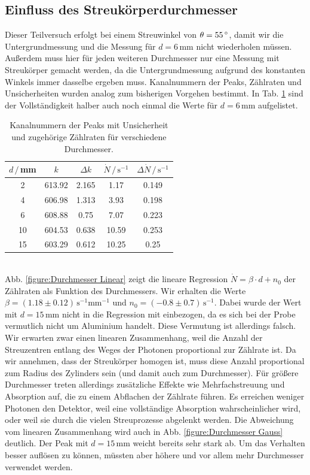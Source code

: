 \documentclass[german, parskip=full]{scrartcl}
\newcommand{\tecxt}{}
\begin{document}
\subsection{Einfluss des Streukörperdurchmesser}
Dieser Teilversuch erfolgt bei einem Streuwinkel von $\theta=55\,\degree$, damit wir die Untergrundmessung und die Messung für $d=6\,$mm nicht wiederholen müssen. Außerdem muss hier für jeden weiteren Durchmesser nur eine Messung mit Streukörper gemacht werden, da die Untergrundmessung aufgrund des konstanten Winkels immer dasselbe ergeben muss. Kanalnummern der Peaks, Zählraten und Unsicherheiten wurden analog zum bisherigen Vorgehen bestimmt. In Tab. \ref{table:Durchmesser} sind der Vollständigkeit halber auch noch einmal die Werte für $d=6\,$mm aufgelistet. 
\begin{table}[h!]
\centering
\begin{tabular}{c|c|c|c|c}
$d\,/\,$mm&$k$&$\Delta k$&$\dot{N}\,/\,\tecxt\text{s}^{-1}$&$\Delta\dot{N}\,/\,\tecxt\text{s}^{-1}$\\ \hline
2 & 613.92 & 2.165 & 1.17 & 0.149 \\ \hline
4 & 606.98 & 1.313 & 3.93 & 0.198 \\ \hline
6 & 608.88 & 0.75 & 7.07 & 0.223 \\ \hline
10 & 604.53 & 0.638 & 10.59 & 0.253 \\ \hline
15 & 603.29 & 0.612 & 10.25 & 0.25 \\ 
\end{tabular}
\caption{Kanalnummern der Peaks mit Unsicherheit und zugehörige Zählraten für verschiedene Durchmesser.}
\label{table:Durchmesser}
\end{table}\\
Abb. \ref{figure:Durchmesser Linear} zeigt die lineare Regression $\dot{N}=\beta\cdot d + n_0$ der Zählraten als Funktion des Durchmessers. Wir erhalten die Werte $\beta=(1.18 \pm 0.12)\,\tecxt\text{s}^{-1}\tecxt\text{mm}^{-1}$ und $n_0=(-0.8\pm 0.7)\,\tecxt\text{s}^{-1}$. Dabei wurde der Wert mit $d=15\,$mm nicht in die Regression mit einbezogen, da es sich bei der Probe vermutlich nicht um Aluminium handelt. Diese Vermutung ist allerdings falsch. Wir erwarten zwar einen linearen Zusammenhang, weil die Anzahl der Streuzentren entlang des Weges der Photonen proportional zur Zählrate ist. Da wir annehmen, dass der Streukörper homogen ist, muss diese Anzahl proportional zum Radius des Zylinders sein (und damit auch zum Durchmesser). Für größere Durchmesser treten allerdings zusätzliche Effekte wie Mehrfachstreuung und Absorption auf, die zu einem Abflachen der Zählrate führen. Es erreichen weniger Photonen den Detektor, weil eine vollständige Absorption wahrscheinlicher wird, oder weil sie durch die vielen Streuprozesse abgelenkt werden. Die Abweichung vom linearen Zusammenhang wird auch in Abb. \ref{figure:Durchmesser Gauss} deutlich. Der Peak mit $d=15\,$mm weicht bereits sehr stark ab. Um das Verhalten besser auflösen zu können, müssten aber höhere und vor allem mehr Durchmesser verwendet werden.
\end{document}
